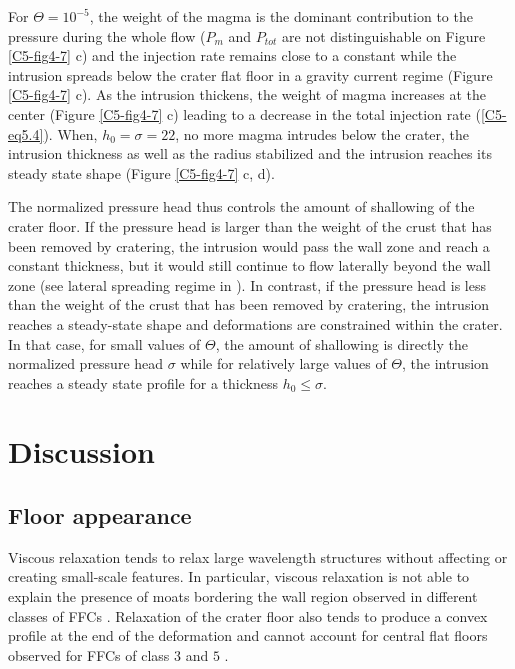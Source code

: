 For  $\Theta=10^{-5}$,  the  weight  of  the  magma  is  the  dominant
contribution  to  the  pressure  during  the  whole  flow  ($P_m$  and
$P_{tot}$ are not distinguishable on Figure \ref{C5-fig4-7} c) and the
injection rate remains close to a constant while the intrusion spreads
below  the crater  flat  floor  in a  gravity  current regime  (Figure
\ref{C5-fig4-7} c).   As the intrusion  thickens, the weight  of magma
increases  at  the center  (Figure  \ref{C5-fig4-7}  c) leading  to  a
decrease  in   the  total  injection  rate   (\ref{C5-eq5.4}).   When,
$h_{0}=\sigma=22$,  no  more  magma  intrudes below  the  crater,  the
intrusion thickness as well as the radius stabilized and the intrusion
reaches its steady state shape (Figure \ref{C5-fig4-7} c, d).

The normalized pressure head thus controls the amount of shallowing of
the crater  floor. If the pressure  head is larger than  the weight of
the crust that has been removed by cratering, the intrusion would pass
the  wall zone  and reach  a constant  thickness, but  it would  still
continue to flow laterally beyond the wall zone (see lateral spreading
regime in \citet{Michaut:2011kg}).  In  contrast, if the pressure head
is  less  than the  weight  of  the crust  that  has  been removed  by
cratering, the intrusion reaches a steady-state shape and deformations
are constrained within  the crater. In that case, for  small values of
$\Theta$, the amount of shallowing is directly the normalized pressure
head  $\sigma$ while  for  relatively large  values  of $\Theta$,  the
intrusion   reaches   a  steady   state   profile   for  a   thickness
$h_{0}\le \sigma$.
	
	
\section{Discussion}

\subsection{Floor appearance}
	
Viscous relaxation tends to  relax large wavelength structures without
affecting or  creating small-scale  features.  In  particular, viscous
relaxation is not able to explain  the presence of moats bordering the
wall    region    observed    in    different    classes    of    FFCs
\citep{Schultz:1976kt,Jozwiak:2012dq}.  Relaxation of the crater floor
also tends to  produce a convex profile at the  end of the deformation
\citep{Dombard:2001gs}  and cannot  account  for  central flat  floors
observed for FFCs of class $3$ and $5$ \citep{Jozwiak:2012dq}.
	
